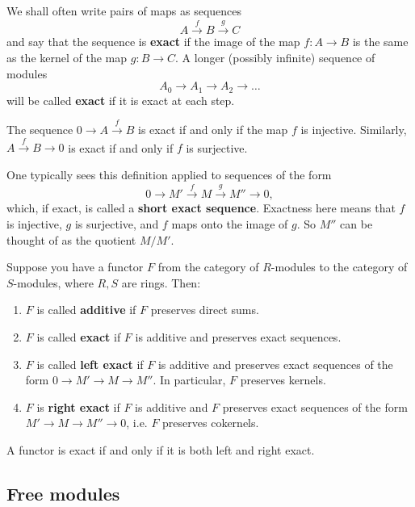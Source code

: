 We shall often write pairs of maps as sequences \[ A \stackrel{f}{\to} B
\stackrel{g}{\to} C \] and say that the sequence is \textbf{exact} if the image
of the map $f:A \to B$ is the same as the kernel of the map $g: B \to C$. A
longer (possibly infinite) sequence of modules \[ A_0 \to A_1 \to A_2 \to \dots
\] will be called \textbf{exact} if it is exact at each step.

\begin{example} The sequence $0 \to A \stackrel{f}{\to} B$ is exact if and only
if the map $f$ is injective. Similarly, $A \stackrel{f}{\to} B \to 0$ is exact
if and only if $f$ is surjective. \end{example}

One typically sees this definition applied to sequences of the form \[ 0 \to
M'\stackrel{f}{ \to} M \stackrel{g}{\to} M'' \to 0, \] which, if exact, is
called a \textbf{short exact sequence}. Exactness here means that $f$ is
injective, $g$ is surjective, and $f$ maps onto the image of $g$. So $M''$ can
be thought of as the quotient $M/M'$.

Suppose you have a functor $F$ from the category of $R$-modules to the category
of $S$-modules, where $R, S$ are rings. Then:

\begin{definition} \begin{enumerate} \item $F$ is called \textbf{additive} if
$F$ preserves direct sums. \item $F$ is called \textbf{exact} if $F$ is
additive and preserves exact sequences. \item $F$ is called \textbf{left exact}
if $F$ is additive and preserves exact sequences of the form $0 \to M' \to M
\to M''$. In particular, $F$ preserves kernels. \item $F$ is \textbf{right
exact} if $F$ is additive and $F$ preserves exact sequences of the form $M' \to
M \to M'' \to 0$, i.e. $F$ preserves cokernels. \end{enumerate}
\end{definition}

A functor is exact if and only if it is both left and right exact.


\subsection{Free modules}

